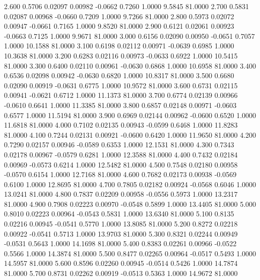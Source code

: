    2.600   0.5706   0.02097   0.00982  -0.0662   0.7260   1.0000   9.5845  81.0000
   2.700   0.5831   0.02087   0.00968  -0.0660   0.7209   1.0000   9.7266  81.0000
   2.800   0.5973   0.02072   0.00947  -0.0661   0.7165   1.0000   9.8520  81.0000
   2.900   0.6121   0.02061   0.00923  -0.0663   0.7125   1.0000   9.9671  81.0000
   3.000   0.6156   0.02090   0.00950  -0.0651   0.7057   1.0000  10.1588  81.0000
   3.100   0.6198   0.02112   0.00971  -0.0639   0.6985   1.0000  10.3638  81.0000
   3.200   0.6283   0.02116   0.00973  -0.0633   0.6922   1.0000  10.5415  81.0000
   3.300   0.6400   0.02110   0.00961  -0.0630   0.6868   1.0000  10.6958  81.0000
   3.400   0.6536   0.02098   0.00942  -0.0630   0.6820   1.0000  10.8317  81.0000
   3.500   0.6680   0.02090   0.00919  -0.0631   0.6775   1.0000  10.9572  81.0000
   3.600   0.6731   0.02115   0.00941  -0.0621   0.6712   1.0000  11.1373  81.0000
   3.700   0.6774   0.02139   0.00966  -0.0610   0.6641   1.0000  11.3385  81.0000
   3.800   0.6857   0.02148   0.00971  -0.0603   0.6577   1.0000  11.5194  81.0000
   3.900   0.6969   0.02144   0.00962  -0.0600   0.6520   1.0000  11.6818  81.0000
   4.000   0.7102   0.02135   0.00943  -0.0599   0.6468   1.0000  11.8283  81.0000
   4.100   0.7244   0.02131   0.00921  -0.0600   0.6420   1.0000  11.9650  81.0000
   4.200   0.7290   0.02157   0.00946  -0.0589   0.6353   1.0000  12.1531  81.0000
   4.300   0.7343   0.02178   0.00967  -0.0579   0.6281   1.0000  12.3588  81.0000
   4.400   0.7432   0.02184   0.00969  -0.0573   0.6214   1.0000  12.5482  81.0000
   4.500   0.7548   0.02180   0.00958  -0.0570   0.6154   1.0000  12.7168  81.0000
   4.600   0.7682   0.02173   0.00938  -0.0569   0.6100   1.0000  12.8695  81.0000
   4.700   0.7805   0.02182   0.00924  -0.0568   0.6046   1.0000  13.0241  81.0000
   4.800   0.7837   0.02209   0.00958  -0.0556   0.5973   1.0000  13.2317  81.0000
   4.900   0.7908   0.02223   0.00970  -0.0548   0.5899   1.0000  13.4405  81.0000
   5.000   0.8010   0.02223   0.00964  -0.0543   0.5831   1.0000  13.6340  81.0000
   5.100   0.8135   0.02216   0.00945  -0.0541   0.5770   1.0000  13.8085  81.0000
   5.200   0.8272   0.02218   0.00922  -0.0541   0.5713   1.0000  13.9703  81.0000
   5.300   0.8321   0.02244   0.00949  -0.0531   0.5643   1.0000  14.1698  81.0000
   5.400   0.8383   0.02261   0.00966  -0.0522   0.5566   1.0000  14.3874  81.0000
   5.500   0.8477   0.02265   0.00964  -0.0517   0.5493   1.0000  14.5957  81.0000
   5.600   0.8596   0.02260   0.00945  -0.0514   0.5426   1.0000  14.7874  81.0000
   5.700   0.8731   0.02262   0.00919  -0.0513   0.5363   1.0000  14.9672  81.0000
